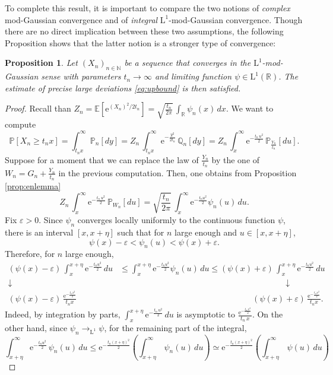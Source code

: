 \documentclass[12pt,a4paper,reqno]{amsart}
\newcommand{\N}{\mathbb{N}}
\newcommand{\R}{\mathbb{R}}
\newcommand{\E}{\mathrm{e}}
\newcommand{\esper}{\mathbb{E}}
\newcommand{\proba}{\mathbb{P}}
\newcommand{\qproba}{\mathbb{Q}}
\newcommand{\eps}{\varepsilon}
\newtheorem{proposition}[theorem]{Proposition}
\theoremstyle{remark}
\begin{document}
To complete this result, it is important to compare the two notions of \emph{complex} mod-Gaussian convergence and of \emph{integral} $\mathrm{L}^1$-mod-Gaussian convergence. Though there are no direct implication between these two assumptions, the following Proposition shows that the latter notion is a stronger type of convergence:
\begin{proposition}\label{l1stronger}
Let $(X_n)_{n \in \N}$ be a sequence that converges in the $\mathrm{L}^1$-mod-Gaussian sense with parameters $t_n \to \infty$ and limiting function $\psi \in \mathrm{L}^1(\R)$. The estimate of precise large deviations \eqref{eq:upbound} is then satisfied.
\end{proposition}
\begin{proof}
Recall than $Z_n=\esper[\E^{(X_n)^2/2t_n}]=\sqrt{\frac{t_n}{2\pi}}\,\int_{\R}\psi_n(x)\,dx$. We want to compute
$$ \proba[X_n \geq t_n x] = \int_{t_n x}^\infty \proba_n[dy] = Z_n\,\int_{t_n x}^\infty \E^{-\frac{y^2}{2t_n}}\,\qproba_n[dy] =Z_n\,\int_{x}^\infty \E^{-\frac{t_n \,u^2}{2}}\,\proba_{\frac{Y_n}{t_n}}[du].
$$
Suppose for a moment that we can replace the law of $\frac{Y_n}{t_n}$ by the one of $W_n=G_n+\frac{Y_n}{t_n}$ in the previous computation. Then, one obtains from Proposition \ref{prop:enlemma}
$$
Z_n\,\int_{x}^\infty \E^{-\frac{t_n \,u^2}{2}}\,\proba_{W_n}[du]= \sqrt{\frac{t_n}{2\pi}}\,\int_{x}^\infty \E^{-\frac{t_n u^2}{2}}\psi_n(u)\,du.
$$
Fix $\eps>0$. Since $\psi_n$ converges locally uniformly to the continuous function $\psi$, there is an interval $[x,x+\eta]$ such that for $n$ large enough and $u \in [x,x+\eta]$, 
$$\psi(x)-\eps < \psi_n(u)<\psi(x) + \eps.$$
 Therefore, for $n$ large enough,
\begin{align*}
(\psi(x)- \eps)\,\int_{x}^{x+\eta} \E^{-\frac{t_n u^2}{2}}\,du &\leq \int_{x}^{x+\eta} \E^{-\frac{t_n u^2}{2}}\psi_n(u)\,du \leq (\psi(x)+ \eps)\,\int_{x}^{x+\eta} \E^{-\frac{t_n u^2}{2}}\,du\\
\downarrow \qquad& \qquad\qquad\qquad\qquad\qquad\qquad\qquad\qquad\qquad\qquad \downarrow \\
(\psi(x)- \eps) \,\frac{\E^{-\frac{t_n x^2}{2}}}{t_n x} &\qquad\qquad\qquad\qquad\qquad\qquad\qquad\qquad(\psi(x)+ \eps) \,\frac{\E^{-\frac{t_n x^2}{2}}}{t_n x}.
\end{align*}
Indeed, by integration by parts, $\int_x^{x+\eta} \E^{-\frac{t_n\,u^2}{2}}\,du$ is asymptotic to $\frac{\E^{-\frac{t_n\,x^2}{2}}}{t_n\,x}$. On the other hand, since $\psi_n \to_{\mathrm{L}^1} \psi$, for the remaining part of the integral,
$$\int_{x+\eta}^\infty \E^{-\frac{t_n u^2}{2}}\,\psi_n(u)\,du  \leq \E^{-\frac{t_n (x+\eta)^2}{2}}\left(\int_{x+\eta}^\infty \,\psi_n(u)\,du\right) \simeq \E^{-\frac{t_n (x+\eta)^2}{2}}\left(\int_{x+\eta}^\infty \,\psi(u)\,du\right) $$

\end{proof}
\end{document}
